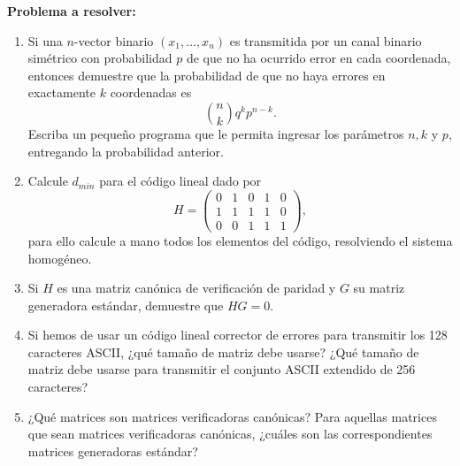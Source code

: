 \documentclass[a4paper]{article}
\begin{document}
\vspace{0.2 cm}
\textbf{Problema a resolver:}
\vspace{0.2 cm}





\begin{enumerate}
\item Si una $n$-vector binario $(x_1,\dots,x_n)$ es transmitida por un canal binario simétrico con probabilidad $p$ de que no ha ocurrido error en cada coordenada, entonces demuestre que la probabilidad de que no haya errores en exactamente $k$ coordenadas es
\[\binom{n}{k}q^kp^{n-k}.\]
Escriba un pequeño programa que le permita ingresar los par\'ametros $n,k$ y $p$, entregando la probabilidad anterior. 

\item Calcule $d_{min}$ para el c\'odigo lineal dado por \[H=\begin{pmatrix}
   0& 1& 0& 1& 0 \\
    1& 1& 1& 1& 0 \\
     0& 0& 1& 1& 1 
\end{pmatrix},\]
para ello calcule a mano todos los elementos del c\'odigo, resolviendo el sistema homog\'eneo.
\item Si $H$ es una matriz can\'onica de verificaci\'on de paridad y $G$ su matriz ge\-nera\-dora estándar, demuestre que $HG=0$.
\item Si hemos de usar un código lineal corrector de errores para transmitir los 128 caracteres ASCII, ¿qué tamaño de matriz debe usarse? ¿Qué tamaño de matriz debe usarse para transmitir el conjunto ASCII extendido de 256 caracteres? 
\item  ¿Qué matrices son matrices verificadoras canónicas? Para aquellas matrices que sean matrices verificadoras canónicas, ¿cuáles son las correspondientes matrices generadoras estándar? %
\end{enumerate}
\end{document}
